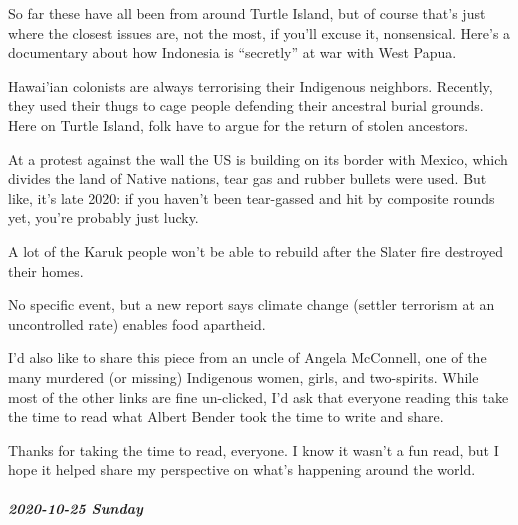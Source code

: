 \documentclass[11pt]{article}
\begin{document}
\begin{itemize}
So far these have all been from around Turtle Island, but of course that’s just where the closest issues are, not the most, if you’ll excuse it, nonsensical. Here’s a documentary about how Indonesia is “secretly” at war with West Papua.

Hawai’ian colonists are always terrorising their Indigenous neighbors. Recently, they used their thugs to cage people defending their ancestral burial grounds. Here on Turtle Island, folk have to argue for the return of stolen ancestors.

At a protest against the wall the US is building on its border with Mexico, which divides the land of Native nations, tear gas and rubber bullets were used. But like, it’s late 2020: if you haven’t been tear-gassed and hit by composite rounds yet, you’re probably just lucky.

A lot of the Karuk people won’t be able to rebuild after the Slater fire destroyed their homes.

No specific event, but a new report says climate change (settler terrorism at an uncontrolled rate) enables food apartheid.

I’d also like to share this piece from an uncle of Angela McConnell, one of the many murdered (or missing) Indigenous women, girls, and two-spirits. While most of the other links are fine un-clicked, I’d ask that everyone reading this take the time to read what Albert Bender took the time to write and share.

Thanks for taking the time to read, everyone. I know it wasn’t a fun read, but I hope it helped share my perspective on what’s happening around the world.
\end{itemize}
\subparagraph*{2020-10-25 Sunday}
\label{sec:org2c75c53}
\end{document}
